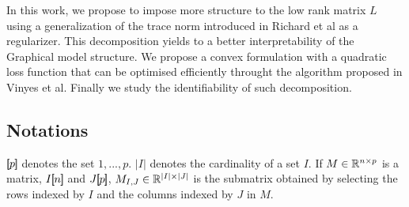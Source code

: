 In this work, we propose to impose more structure to the low rank matrix $L$ using a generalization of the trace norm introduced in Richard et al as a regularizer. This decomposition yields to a better interpretability of the Graphical model structure. We propose a convex formulation with a quadratic loss function that can be optimised efficiently throught the algorithm proposed in Vinyes et al.  Finally we study the identifiability of such decomposition. 

\subsection*{Notations}
$[\!\![p]\!\!]$ denotes the set ${1,...,p}$. $|I|$ denotes the cardinality of a set $I$. If $M\in\mathbb{R}^{n\times p}$ is a matrix, $I[\!\![n]\!\!]$ and $J[\!\![p]\!\!]$, $M_{I,J}\in\mathbb{R}^{|I|\times |J|}$ is the submatrix obtained by selecting the rows indexed by $I$ and the columns indexed by $J$ in $M$.

%
